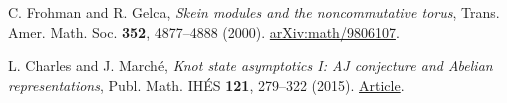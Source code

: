 C. Frohman and R. Gelca, \emph{Skein modules and the noncommutative torus},
Trans. Amer. Math. Soc. \textbf{352}, 4877--4888 (2000).
\href{https://arxiv.org/abs/math/9806107}{arXiv:math/9806107}.

L. Charles and J. March\'e, \emph{Knot state asymptotics I: AJ conjecture and Abelian representations},
Publ. Math. IH\'ES \textbf{121}, 279--322 (2015).
\href{https://numdam.org/articles/10.1007/s10240-015-0068-y/}{Article}.
